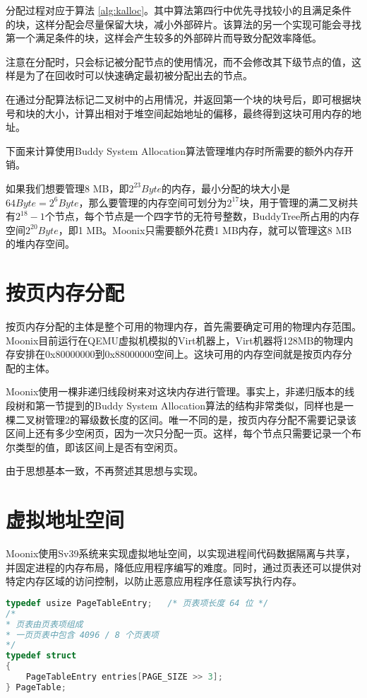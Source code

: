 分配过程对应于算法 \ref{alg:kalloc}。其中算法第四行中优先寻找较小的且满足条件的块，这样分配会尽量保留大块，减小外部碎片。该算法的另一个实现可能会寻找第一个满足条件的块，这样会产生较多的外部碎片而导致分配效率降低。

注意在分配时，只会标记被分配节点的使用情况，而不会修改其下级节点的值，这样是为了在回收时可以快速确定最初被分配出去的节点。

在通过分配算法标记二叉树中的占用情况，并返回第一个块的块号后，即可根据块号和块的大小，计算出相对于堆空间起始地址的偏移，最终得到这块可用内存的地址。

下面来计算使用Buddy System Allocation算法管理堆内存时所需要的额外内存开销。

如果我们想要管理8 MB，即$2^{23} Byte$的内存，最小分配的块大小是$64 Byte = 2^6 Byte$，那么要管理的内存空间可划分为$2^{17}$块，用于管理的满二叉树共有$2^{18} - 1$个节点，每个节点是一个四字节的无符号整数，BuddyTree所占用的内存空间$2^{20} Byte$，即1 MB。Moonix只需要额外花费1 MB内存，就可以管理这8 MB的堆内存空间。

\section{按页内存分配}

按页内存分配的主体是整个可用的物理内存，首先需要确定可用的物理内存范围。Moonix目前运行在QEMU虚拟机模拟的Virt机器上，Virt机器将128MB的物理内存安排在0x80000000到0x88000000空间上。这块可用的内存空间就是按页内存分配的主体。

Moonix使用一棵非递归线段树来对这块内存进行管理。事实上，非递归版本的线段树和第一节提到的Buddy System Allocation算法的结构非常类似，同样也是一棵二叉树管理2的幂级数长度的区间。唯一不同的是，按页内存分配不需要记录该区间上还有多少空闲页，因为一次只分配一页。这样，每个节点只需要记录一个布尔类型的值，即该区间上是否有空闲页。

由于思想基本一致，不再赘述其思想与实现。

\section{虚拟地址空间}

Moonix使用Sv39系统来实现虚拟地址空间，以实现进程间代码数据隔离与共享，并固定进程的内存布局，降低应用程序编写的难度。同时，通过页表还可以提供对特定内存区域的访问控制，以防止恶意应用程序任意读写执行内存。

\begin{lstlisting}[language={C}, caption={页表相关数据结构定义}, label={lst:pagetable}]
typedef usize PageTableEntry;   /* 页表项长度 64 位 */
/*
* 页表由页表项组成 
* 一页页表中包含 4096 / 8 个页表项
*/
typedef struct
{
	PageTableEntry entries[PAGE_SIZE >> 3];
} PageTable;
\end{lstlisting}

